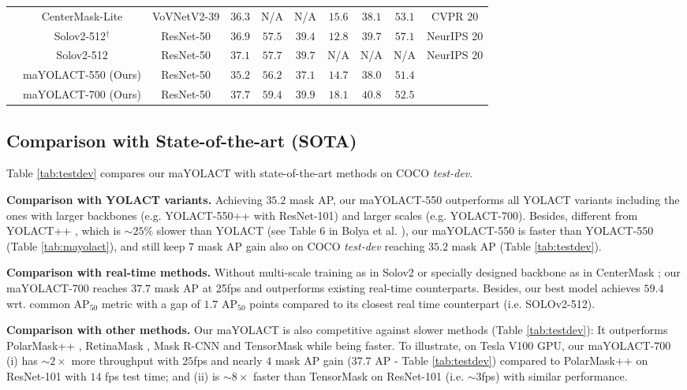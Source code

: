 \documentclass{bmvc2k}
\begin{document}
\begin{table}
\begin{tabular}{|c|c|c|c|c|c|c|c|c|c|}
    &CenterMask-Lite \cite{centermask} & VoVNetV2-39 &$36.3$&N/A&N/A&$15.6$&$38.1$&$53.1$&CVPR 20\\
    &Solov2-512$^\dagger$ \cite{solov2-imp} & ResNet-50 &$36.9$&$57.5$&$39.4$&$12.8$&$39.7$&$\mathbf{57.1}$&NeurIPS 20\\
    &Solov2-512 \cite{solov2} & ResNet-50 &$37.1$&$57.7$&$39.7$&N/A&N/A&N/A&NeurIPS 20\\
\cline{2-10}
&maYOLACT-550 (Ours) & ResNet-50&$35.2$ &$56.2$&$37.1$& $14.7$&$38.0$&$51.4$ &\\
    &maYOLACT-700 (Ours) & ResNet-50&$\mathbf{37.7}$ &$\mathbf{59.4}$&$\mathbf{39.9}$& $18.1$&$\mathbf{40.8}$&$52.5$ &\\
\hline
    \end{tabular}
\end{table}
\subsection{Comparison with State-of-the-art (SOTA)}
Table \ref{tab:testdev} compares our maYOLACT with state-of-the-art methods on COCO \textit{test-dev}.

\noindent \textbf{Comparison with YOLACT variants.} Achieving $35.2$ mask AP, our maYOLACT-550 outperforms all YOLACT variants including the ones with larger backbones (e.g. YOLACT-550++ with ResNet-101) and larger scales (e.g. YOLACT-700). Besides, different from YOLACT++ \cite{yolact-plus}, which is $\sim 25\%$ slower than YOLACT (see Table 6 in Bolya et al. \cite{yolact-plus}), our maYOLACT-550 is faster than YOLACT-550 (Table \ref{tab:mayolact}), and still keep $7$ mask AP gain also on COCO \textit{test-dev} reaching $35.2$ mask AP (Table \ref{tab:testdev}).

\noindent \textbf{Comparison with real-time methods.} Without multi-scale training as in Solov2 \cite{solov2} or specially designed backbone as in CenterMask \cite{centermask}; our maYOLACT-700 reaches $37.7$ mask AP at 25fps and outperforms existing real-time counterparts. Besides, our best model achieves $59.4$ wrt. common $\mathrm{AP_{50}}$ metric with a gap of $1.7$ $\mathrm{AP_{50}}$ points compared to its closest real time counterpart (i.e. SOLOv2-512).  

\noindent \textbf{Comparison with other methods.} Our maYOLACT is also competitive against slower methods (Table \ref{tab:testdev}): It outperforms PolarMask++ \cite{PolarMask-plus}, RetinaMask \cite{retinamask}, Mask R-CNN \cite{MaskRCNN} and TensorMask \cite{tensormask} while being faster. To illustrate, on Tesla V100 GPU, our maYOLACT-700 (i) has $\sim 2\times$ more throughput with $25$fps and nearly $4$ mask AP gain ($37.7$ AP - Table \ref{tab:testdev}) compared to PolarMask++ on ResNet-101 with $14$ fps test time;  and (ii) is $\sim 8 \times$ faster than TensorMask on ResNet-101 (i.e. $\sim 3$fps) with similar performance.
\end{document}
